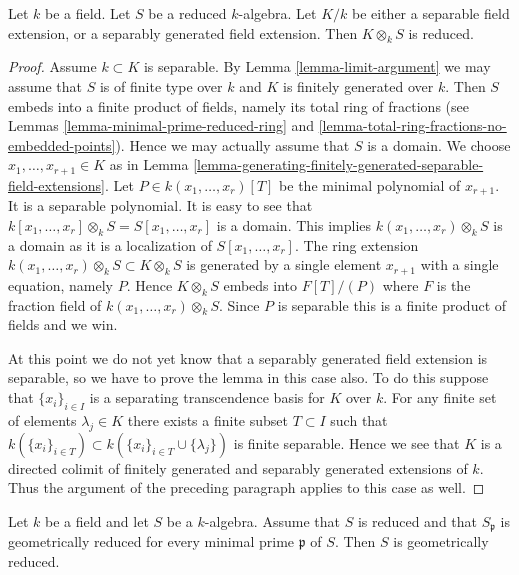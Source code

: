 \begin{lemma}
\label{lemma-separable-extension-preserves-reducedness}
Let $k$ be a field.
Let $S$ be a reduced $k$-algebra.
Let $K/k$ be either a separable field extension,
or a separably generated field extension.
Then $K \otimes_k S$ is reduced.
\end{lemma}

\begin{proof}
Assume $k \subset K$ is separable.
By Lemma \ref{lemma-limit-argument}
we may assume that $S$ is of finite type over $k$
and $K$ is finitely generated over $k$.
Then $S$ embeds into a finite product of fields,
namely its total ring of fractions (see
Lemmas \ref{lemma-minimal-prime-reduced-ring} and
\ref{lemma-total-ring-fractions-no-embedded-points}).
Hence we may actually assume that $S$ is a domain.
We choose $x_1, \ldots, x_{r + 1} \in K$ as in
Lemma \ref{lemma-generating-finitely-generated-separable-field-extensions}.
Let $P \in k(x_1, \ldots, x_r)[T]$
be the minimal polynomial of $x_{r + 1}$. It is a separable polynomial.
It is easy to see that
$k[x_1, \ldots, x_r] \otimes_k S = S[x_1, \ldots, x_r]$ is a domain.
This implies $k(x_1, \ldots, x_r) \otimes_k S$ is a domain
as it is a localization of $S[x_1, \ldots, x_r]$.
The ring extension $k(x_1, \ldots, x_r) \otimes_k S \subset K \otimes_k S$
is generated by a single element $x_{r + 1}$ with a single
equation, namely $P$. Hence $K \otimes_k S$ embeds into
$F[T]/(P)$ where $F$ is the fraction field of $k(x_1, \ldots, x_r) \otimes_k S$.
Since $P$ is separable this is a finite product of fields and we win.

\medskip\noindent
At this point we do not yet know that a separably generated field
extension is separable, so we have to prove the lemma in this case also.
To do this suppose that $\{x_i\}_{i \in I}$ is a separating
transcendence basis for $K$ over $k$. For any finite set of elements
$\lambda_j \in K$ there exists a finite subset $T \subset I$ such
that $k(\{x_i\}_{i\in T}) \subset k(\{x_i\}_{i \in T} \cup \{\lambda_j\})$
is finite separable. Hence we see that $K$ is a directed colimit of
finitely generated and separably generated extensions of $k$. Thus
the argument of the preceding paragraph applies to this case as well.
\end{proof}

\begin{lemma}
\label{lemma-generic-points-geometrically-reduced}
Let $k$ be a field and let $S$ be a $k$-algebra. Assume that
$S$ is reduced and that $S_{\mathfrak p}$ is geometrically
reduced for every minimal prime $\mathfrak p$ of $S$.
Then $S$ is geometrically reduced.
\end{lemma}

